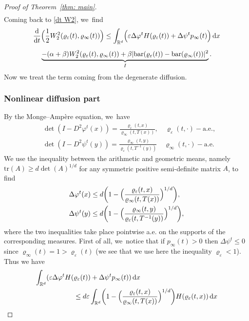\documentclass[JEP,XML,SOM,Unicode,published]{cedram}
\newcommand{\Bprt}[1]{\Bigl(#1\Bigr)}
\newcommand{\bbprt}[1]{\biggl(#1\biggr)}
\newcommand{\dx}[1]{\mathop{}\!\mathrm{d} #1}
\newcommand{\ddt}{\frac{\dx{}}{\dx{t}}}
\newcommand{\R}{\mathbb{R}}
\theoremstyle{plain}
\theoremstyle{remark}
\begin{document}
\begin{proof}[Proof of Theorem~\ref{thm: main}]
\begin{multline*}
\end{multline*}
Coming back to \eqref{dt W2}, we~find
\begin{multline}\label{final_singular}
\ddt \Bprt{\frac 12 W_2^2(\varrho_\varepsilon(t), \varrho_\infty(t))}\leq \int_{\R^d} \Bprt{\varepsilon\Delta \varphi^t H(\varrho_\varepsilon(t)) +\Delta \psi^t p_\infty(t) }\dx x \\[5pt]
\underbrace{- (\alpha+\beta) W_2^2(\varrho_\varepsilon(t), \varrho_\infty(t)) + \beta |\mathrm{bar}(\varrho_\varepsilon(t))- \mathrm{bar}(\varrho_\infty(t))|^2}_{I}.
\end{multline}
Now we treat the term coming from the degenerate diffusion.

\subsubsection*{Nonlinear diffusion part}
By the Monge--Ampère equation, we~have
\begin{align*}
&\det (I - D^2 \varphi^t(x)) = \frac{\varrho_\varepsilon(t,x)}{\varrho_\infty(t,T (x))}, \quad \varrho_{\varepsilon}(t,\cdot)-\mathrm{a.e.},\\
&\det (I - D^2 \psi^t(y)) = \frac{\varrho_\infty(t,y)}{\varrho_\varepsilon(t,T^{-1}(y))} \quad \varrho_{\infty}(t,\cdot)-\mathrm{a.e.}
\end{align*}
We use the inequality between the arithmetic and geometric means, namely $\mathrm{tr} (A) \geq d \det (A)^{1/d}$ for any symmetric positive semi-definite matrix $A$, to find
\begin{align*}
&\Delta \varphi^t(x)\leq d\bbprt{1-\Bprt{\frac{\varrho_\varepsilon(t,x)}{\varrho_\infty(t,T(x))}}^{1/d}}, \\
&\Delta \psi^t(y)\leq d\bbprt{1-\Bprt{\frac{\varrho_\infty(t,y)}{\varrho_\varepsilon(t,T^{-1}(y))}}^{1/d}},
\end{align*}
where the two inequalities take place pointwise a.e. on the supports of the corresponding measures.
First of all, we~notice that if $p_\infty(t)>0$ then $\Delta \psi^t\le 0$ since $\varrho_\infty(t)=1> \varrho_\varepsilon(t)$ (we see that we use here the inequality $ \varrho_\varepsilon<1$). Thus we have
\begin{equation*}
\begin{split}
\int_{\R^d} (\varepsilon \Delta \varphi^t H(&\varrho_\varepsilon(t)) +\Delta \psi^t p_\infty(t) )\dx x
\\
&\leq d \varepsilon \int_{\R^d} \bbprt{1-\Bprt{\frac{\varrho_\varepsilon(t,x)}{\varrho_\infty(t,T(x))}}^{1/d}} H(\varrho_\varepsilon(t,x)) \dx x\\

\end{split}
\end{equation*}
\end{proof}
\end{document}
